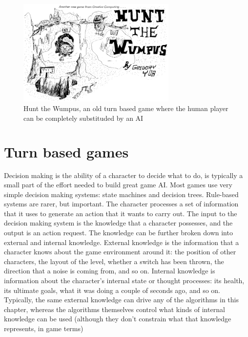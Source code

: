 \begin{figure}
  \centering
      \includegraphics[width=0.7\textwidth]{images/wumpus.png}
  \caption{Hunt the Wumpus, an old turn based game where the human player can be completely substituded by an AI}
\end{figure}

\section{Turn based games}
Decision making is the ability of a character to decide what to do, is typically a small part of the effort needed to build great game
AI. 
Most games use very simple decision making systems: state machines and decision trees.
Rule-based systems are rarer, but important.
The character processes a set of information that it uses to generate an action that it wants to
carry out. The input to the decision making system is the knowledge that a character possesses,
and the output is an action request. The knowledge can be further broken down into external
and internal knowledge. External knowledge is the information that a character knows about the
game environment around it: the position of other characters, the layout of the level, whether a
switch has been thrown, the direction that a noise is coming from, and so on. Internal knowledge
is information about the character’s internal state or thought processes: its health, its ultimate
goals, what it was doing a couple of seconds ago, and so on.
Typically, the same external knowledge can drive any of the algorithms in this chapter, whereas
the algorithms themselves control what kinds of internal knowledge can be used (although they
don’t constrain what that knowledge represents, in game terms)
